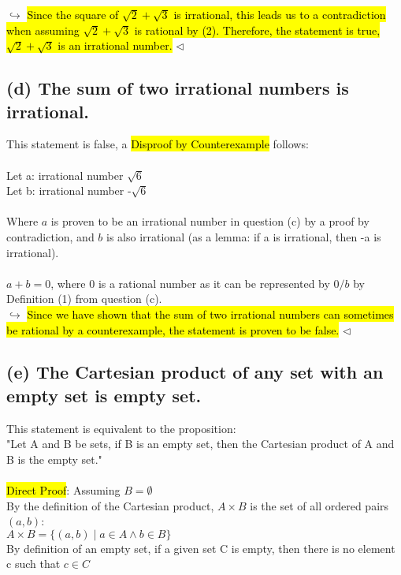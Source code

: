 \documentclass[a4paper, 12pt]{article}
\begin{document}
$\hookrightarrow$ \hl{Since the square of $\sqrt2 + \sqrt3$ is irrational, this leads us to a contradiction when assuming $\sqrt2 + \sqrt3$ is rational by (2). Therefore, the statement is true,  $\sqrt2 + \sqrt3$ is an irrational number.} $\lhd$

\subsection*{(d) The sum of two irrational numbers is irrational.}

This statement is false, a \hl{Disproof by Counterexample} follows:\\
\\
Let a: irrational number $\sqrt6$\\
Let b: irrational number -$\sqrt6$\\
\\
Where $a$ is proven to be an irrational number in question (c) by a proof by contradiction, and $b$ is also irrational (as a lemma: if a is irrational, then -a is irrational).
\\\\
$a + b = 0$, where 0 is a rational number as it can be represented by $0/b$ by Definition (1) from question (c).\\

$\hookrightarrow$ \hl{Since we have shown that the sum of two irrational numbers can sometimes be rational by a counterexample, the statement is proven to be false.} $\lhd$

\subsection*{(e) The Cartesian product of any set with an empty set is empty set.}

This statement is equivalent to the proposition: \\
"Let A and B be sets, if B is an empty set, then the Cartesian product of A and B is the empty set."\\
\\
\hl{Direct Proof}: Assuming $B = \emptyset$\\

By the definition of the Cartesian product, $A \times B$ is the set of all ordered pairs $(a, b)$:\\
$A \times B = \{(a,b) \;| \; a \in A \land b \in B\}$ \\

By definition of an empty set, if a given set C is empty, then there is no element c such that $c\in C$\\
\end{document}
